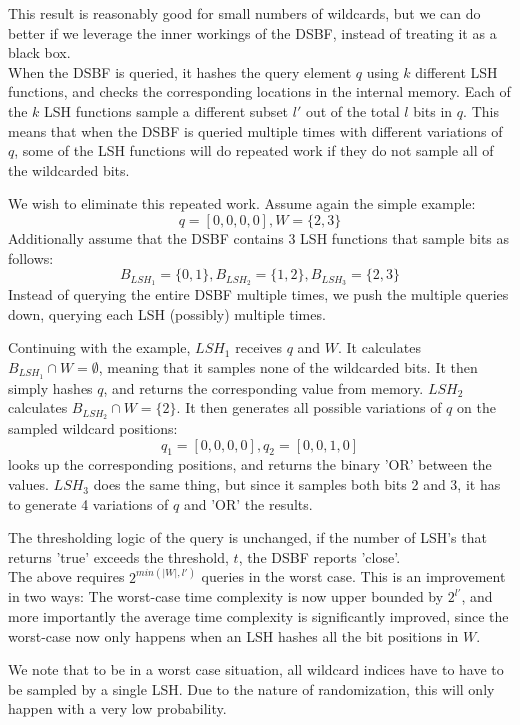\documentclass[a4paper,11pt]{article}
\begin{document}
This result is reasonably good for small numbers of wildcards, but we can do better if we leverage the inner workings of the DSBF, instead of treating it as a black box.\\

When the DSBF is queried, it hashes the query element $q$ using $k$ different LSH functions, and checks the corresponding locations in the internal memory. Each of the $k$ LSH functions sample a different subset $l'$ out of the total $l$ bits in $q$. This means that when the DSBF is queried multiple times with different variations of $q$, some of the LSH functions will do repeated work if they do not sample all of the wildcarded bits.

We wish to eliminate this repeated work. Assume again the simple example:
\[q=[0,0,0,0], W=\{2,3\}\]
Additionally assume that the DSBF contains 3 LSH functions that sample bits as follows:
\[B_{LSH_1}=\{0,1\}, B_{LSH_2}=\{1,2\}, B_{LSH_3}=\{2,3\}\]
Instead of querying the entire DSBF multiple times, we push the multiple queries down, querying each LSH (possibly) multiple times.

Continuing with the example, $LSH_1$ receives $q$ and $W$. It calculates $B_{LSH_1} \cap W = \emptyset $, meaning that it samples none of the wildcarded bits. It then simply hashes $q$, and returns the corresponding value from memory.
$LSH_2$ calculates $B_{LSH_2} \cap W = \{2\}$. It then generates all possible variations of $q$ on the sampled wildcard positions:
\[q_1=[0,0,0,0], q_2=[0,0,1,0]\]
looks up the corresponding positions, and returns the binary 'OR' between the values.
$LSH_3$ does the same thing, but since it samples both bits 2 and 3, it has to generate 4 variations of $q$ and 'OR' the results.

The thresholding logic of the query is unchanged, if the number of LSH's that returns 'true' exceeds the threshold, $t$, the DSBF reports 'close'.\\

\label{lbl:worst_case}
The above requires $2^{min(|W|, l')}$ queries in the worst case.
This is an improvement in two ways: The worst-case time complexity is now upper bounded by $2^{l'}$, and more importantly the average time complexity is significantly improved, since the worst-case now only happens when an LSH hashes all the bit positions in $W$.

We note that to be in a worst case situation, all wildcard indices have to have to be sampled by a single LSH. Due to the nature of randomization, this will only happen with a very low probability.
\end{document}
